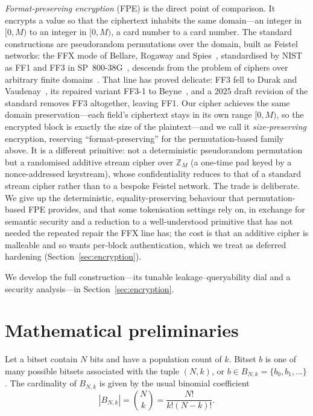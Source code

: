 \documentclass[entropy,article,submit,oneauthor,pdftex]{Definitions/mdpi}
\begin{document}
\emph{Format-preserving encryption} (FPE) is the direct point of comparison. It
encrypts a value so that the ciphertext inhabits the same domain---an integer in
$[0,M)$ to an integer in $[0,M)$, a card number to a card number. The standard
constructions are pseudorandom permutations over the domain, built as Feistel
networks: the FFX mode of Bellare, Rogaway and Spies~\cite{bellare2010ffx}, standardised
by NIST as FF1 and FF3 in SP~800-38G~\cite{dworkin2016fpe}, descends from the problem of
ciphers over arbitrary finite domains~\cite{black2002arbitrary}. That line has proved
delicate: FF3 fell to Durak and Vaudenay~\cite{durak2017ff3}, its repaired variant
FF3-1 to Beyne~\cite{beyne2021ff31}, and a 2025 draft revision of the standard removes
FF3 altogether, leaving FF1. Our cipher achieves the same domain preservation---each
field's ciphertext stays in its own range $[0,M)$, so the encrypted block is exactly
the size of the plaintext---and we call it \emph{size-preserving} encryption, reserving
``format-preserving'' for the permutation-based family above. It is a different
primitive: not a deterministic pseudorandom permutation but a randomised additive stream
cipher over $\mathbb{Z}_M$ (a one-time pad keyed by a nonce-addressed keystream), whose
confidentiality reduces to that of a standard stream cipher rather than to a bespoke
Feistel network. The trade is
deliberate. We give up the deterministic, equality-preserving behaviour that
permutation-based FPE provides, and that some tokenisation settings rely on, in exchange
for semantic security and a reduction to a well-understood primitive that has not
needed the repeated repair the FFX line has; the cost is that an additive cipher is
malleable and so wants per-block authentication, which we treat as deferred hardening
(Section~\ref{sec:encryption}).

We develop the full
construction---its tunable leakage--queryability dial and a security analysis---in
Section~\ref{sec:encryption}.

\section{Mathematical preliminaries}\label{sec:mathematical-preliminaries}
Let a bitset contain $N$ bits and have a population count of $k$.
Bitset $b$ is one of many possible bitsets associated with the tuple $(N,k)$, or $b\in{B_{N,k}}=\{b_0, b_1, \dots\}$.
The cardinality of $B_{N,k}$ is given by the usual binomial coefficient
\begin{equation}
|B_{N,k}|=\binom{N}{k}=\frac{N!}{k!(N-k)!}.
\end{equation}
\end{document}
